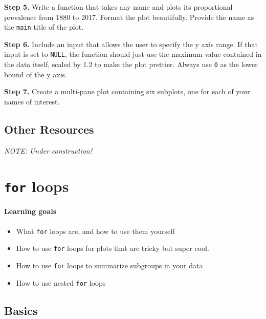 \documentclass[
]{book}
\providecommand{\tightlist}{%
  \setlength{\itemsep}{0pt}\setlength{\parskip}{0pt}}
\begin{document}
\textbf{Step 5.} Write a function that takes any name and plots its proportional prevalence from 1880 to 2017. Format the plot beautifully. Provide the name as the \texttt{main} title of the plot.

\textbf{Step 6.} Include an input that allows the user to specify the y axis range. If that input is set to \texttt{NULL}, the function should just use the maximum value contained in the data itself, scaled by 1.2 to make the plot prettier. Always use \texttt{0} as the lower bound of the y axis.

\textbf{Step 7.} Create a multi-pane plot containing six subplots, one for each of your names of interest.

\hypertarget{other-resources-6}{%
\section*{Other Resources}\label{other-resources-6}}

\emph{NOTE: Under construction!}

\hypertarget{for-loops}{%
\chapter{\texorpdfstring{\texttt{for} loops}{for loops}}\label{for-loops}}

\hypertarget{learning-goals-13}{%
\subsubsection*{Learning goals}\label{learning-goals-13}}

\begin{itemize}
\tightlist
\item
  What \texttt{for} loops are, and how to use them yourself
\item
  How to use \texttt{for} loops for plots that are tricky but super cool.
\item
  How to use \texttt{for} loops to summarize subgroups in your data
\item
  How to use nested \texttt{for} loops
\end{itemize}

\hypertarget{basics-1}{%
\section*{Basics}\label{basics-1}}
\end{document}
